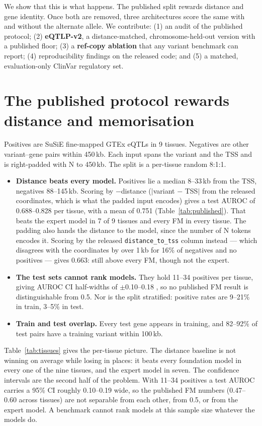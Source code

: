 We show that this is what happens. The published split rewards distance and gene
identity. Once both are removed, three architectures score the same with and
without the alternate allele. We contribute: (1) an audit of the published
protocol; (2) \textbf{eQTLP-v2}, a distance-matched, chromosome-held-out version
with a published floor; (3) a \textbf{ref-copy ablation} that any variant
benchmark can report; (4) reproducibility findings on the released code; and (5)
a matched, evaluation-only ClinVar regulatory set.

\section{The published protocol rewards distance and memorisation}

Positives are SuSiE \citep{wang2020susie} fine-mapped GTEx \citep{gtex2020} eQTLs
in 9 tissues. Negatives are other variant--gene pairs within 450\,kb. Each input
spans the variant and the TSS and is right-padded with N to 450\,kb. The split is
a per-tissue random 8:1:1.

\begin{itemize}
\item \textbf{Distance beats every model.} Positives lie a median 8--33\,kb from
the TSS, negatives 88--145\,kb. Scoring by $-$distance ($|$variant $-$ TSS$|$
from the released coordinates, which is what the padded input encodes) gives a
test AUROC of 0.688--0.828 per tissue, with a mean of 0.751 (Table~\ref{tab:published}).
That beats the expert model in 7 of 9 tissues and every FM in every tissue. The
padding also hands the distance to the model, since the number of N tokens
encodes it.
\ifdefined\RECOMB
Scoring by the released \texttt{distance\_to\_tss} column instead --- which
disagrees with the coordinates by over 1\,kb for 16\% of negatives and no
positives --- gives 0.663: still above every FM, though not the expert.
\fi
\item \textbf{The test sets cannot rank models.} They hold 11--34 positives per
tissue, giving AUROC CI half-widths of $\pm$0.10--0.18 \citep{hanley1982auc}, so
no published FM result is distinguishable from 0.5. Nor is the split stratified:
positive rates are 9--21\% in train, 3--5\% in test.
\item \textbf{Train and test overlap.} Every test gene appears in training, and
82--92\% of test pairs have a training variant within 100\,kb.
\end{itemize}

\ifdefined\RECOMB
Table~\ref{tab:tissues} gives the per-tissue picture. The distance baseline is
not winning on average while losing in places: it beats every foundation model in
every one of the nine tissues, and the expert model in seven. The confidence
intervals are the second half of the problem. With 11--34 positives a test AUROC
carries a 95\% CI roughly 0.10--0.19 wide, so the published FM numbers
(0.47--0.60 across tissues) are not separable from each other, from 0.5, or from
the expert model. A benchmark cannot rank models at this sample size whatever the
models do.

\fi

